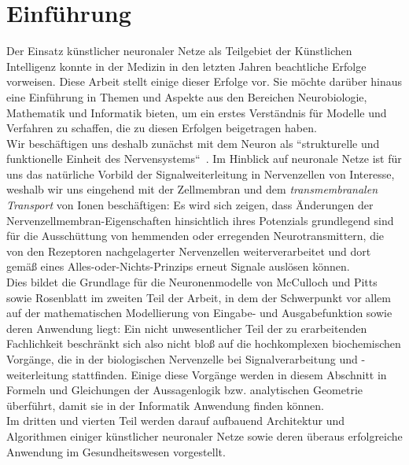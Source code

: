 \chapter{Einführung}

Der Einsatz künstlicher neuronaler Netze als Teilgebiet der Künstlichen Intelligenz konnte in der Medizin in den letzten Jahren beachtliche Erfolge vorweisen.
Diese Arbeit stellt einige dieser Erfolge vor.
Sie möchte darüber hinaus eine Einführung in Themen und Aspekte aus den Bereichen Neurobiologie, Mathematik und Informatik bieten, um ein erstes Verständnis für Modelle und Verfahren zu schaffen, die zu diesen Erfolgen beigetragen haben.\\

Wir beschäftigen uns deshalb zunächst mit dem Neuron als ``strukturelle und funktionelle Einheit des Nervensystems``~\cite[42]{SD07}.
Im Hinblick auf neuronale Netze ist für uns das natürliche Vorbild der Signalweiterleitung in Nervenzellen von Interesse, weshalb wir uns eingehend mit der Zellmembran und dem \textit{transmembranalen Transport} von Ionen beschäftigen: Es wird sich zeigen, dass Änderungen der Nervenzellmembran-Eigenschaften hinsichtlich ihres Potenzials grundlegend sind für die Ausschüttung von hemmenden oder erregenden Neurotransmittern, die von den Rezeptoren nachgelagerter Nervenzellen weiterverarbeitet und dort gemäß eines Alles-oder-Nichts-Prinzips erneut Signale auslösen können.\\

Dies bildet die Grundlage für die Neuronenmodelle von McCulloch und Pitts sowie Rosenblatt im zweiten Teil der Arbeit, in dem der Schwerpunkt vor allem auf der mathematischen Modellierung von Eingabe- und Ausgabefunktion sowie deren Anwendung liegt: Ein nicht unwesentlicher Teil der zu erarbeitenden Fachlichkeit beschränkt sich also nicht bloß auf die hochkomplexen biochemischen Vorgänge, die in der biologischen Nervenzelle bei Signalverarbeitung und -weiterleitung stattfinden.
Einige diese Vorgänge werden in diesem Abschnitt in Formeln und Gleichungen der Aussagenlogik {bzw.} analytischen Geometrie überführt, damit sie in der Informatik Anwendung finden können.\\

Im dritten und vierten Teil werden darauf aufbauend Architektur und Algorithmen einiger künstlicher neuronaler Netze sowie deren überaus erfolgreiche Anwendung im Gesundheitswesen vorgestellt.
